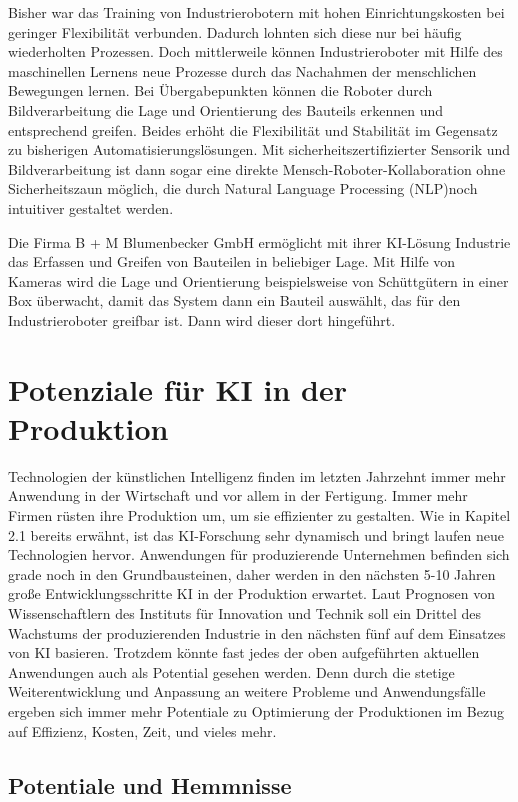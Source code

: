 \documentclass[a4paper,12pt, german]{report}
\begin{document}
Bisher war das Training von Industrierobotern mit hohen Einrichtungskosten bei geringer Flexibilität verbunden. Dadurch lohnten sich diese nur bei häufig wiederholten Prozessen. Doch mittlerweile können Industrieroboter mit Hilfe des maschinellen Lernens neue Prozesse durch das Nachahmen der menschlichen Bewegungen lernen. Bei Übergabepunkten können die Roboter durch Bildverarbeitung die Lage und Orientierung des Bauteils erkennen und entsprechend greifen. Beides erhöht die Flexibilität und Stabilität im Gegensatz zu bisherigen Automatisierungslösungen.
Mit sicherheitszertifizierter Sensorik und Bildverarbeitung ist dann sogar eine  direkte Mensch-Roboter-Kollaboration ohne Sicherheitszaun möglich, die durch Natural Language Processing (NLP)noch intuitiver gestaltet werden.

Die Firma B + M Blumenbecker GmbH ermöglicht mit ihrer KI-Lösung Industrie das Erfassen und Greifen von Bauteilen in beliebiger Lage. Mit Hilfe von Kameras wird die Lage und Orientierung beispielsweise von Schüttgütern in einer Box überwacht, damit das System dann ein Bauteil auswählt, das für den Industrieroboter greifbar ist. Dann wird dieser dort hingeführt. \cite{24}

\chapter{Potenziale für KI in der Produktion}
Technologien der künstlichen Intelligenz finden im letzten Jahrzehnt immer mehr Anwendung in der Wirtschaft und vor allem in der Fertigung. Immer mehr Firmen rüsten ihre Produktion um, um sie effizienter zu gestalten. Wie in Kapitel 2.1 bereits erwähnt, ist das KI-Forschung sehr dynamisch und bringt laufen neue Technologien hervor. Anwendungen für produzierende Unternehmen befinden sich grade noch in den Grundbausteinen, daher werden in den nächsten 5-10 Jahren große Entwicklungsschritte KI in der Produktion erwartet.\cite{08} 
Laut Prognosen von Wissenschaftlern des Instituts für Innovation und Technik soll ein Drittel des Wachstums der produzierenden Industrie in den nächsten fünf auf dem Einsatzes von KI basieren.\cite{24}
Trotzdem könnte fast jedes der oben aufgeführten aktuellen Anwendungen auch als Potential gesehen werden. Denn durch die stetige Weiterentwicklung und Anpassung an weitere Probleme und Anwendungsfälle ergeben sich immer mehr Potentiale zu Optimierung der Produktionen im Bezug auf Effizienz, Kosten, Zeit, und vieles mehr. 

\section{Potentiale und Hemmnisse}
\end{document}
